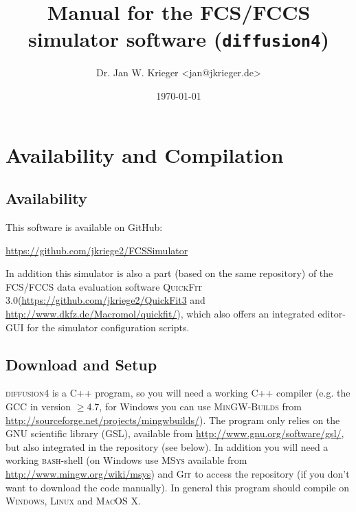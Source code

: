 \documentclass[a4paper,twoside,10pt]{report}
\newcommand{\df}{\textsc{diffusion4}\xspace}
\newcommand{\qf}{\textsc{QuickFit 3.0}\xspace}
\newcommand{\bash}{\textsc{bash}\xspace}
\newcommand{\msys}{\textsc{MSys}\xspace}
\begin{document}
\pagestyle{empty} %

\title{Manual for the FCS/FCCS simulator software (\texttt{diffusion4})}
\author{Dr. Jan W. Krieger <jan@jkrieger.de>}
\date{\today} %
\maketitle

\tableofcontents %
\cleardoublepage %

\pagestyle{plain} %

\chapter{Availability and Compilation}
\label{sec:availability_compilation}
\section{Availability}
\label{sec:Availability}

This software is available on GitHub:
\begin{center}
	\url{https://github.com/jkriege2/FCSSimulator}
\end{center}
In addition this simulator is also a part (based on the same repository) of the FCS/FCCS data evaluation software \qf (\url{https://github.com/jkriege2/QuickFit3} and \url{http://www.dkfz.de/Macromol/quickfit/}), which also offers an integrated editor-GUI for the simulator configuration scripts.

\section{Download and Setup}
\label{sec:DownloadAndSetup}
\df is a C++ program, so you will need a working C++ compiler (e.g. the \textsc{GCC} in version $\geq$4.7, for Windows you can use \textsc{MinGW-Builds} from \url{http://sourceforge.net/projects/mingwbuilds/}). The program only relies on the GNU scientific library (GSL), available from \url{http://www.gnu.org/software/gsl/}, but also integrated in the repository (see below). In addition you will need a working \bash-shell (on Windows use \msys available from \url{http://www.mingw.org/wiki/msys}) and \textsc{Git} to access the repository (if you don't want to download the code manually). In general this program should compile on \textsc{Windows}, \textsc{Linux} and \textsc{MacOS X}.\\[10mm]
\end{document}
